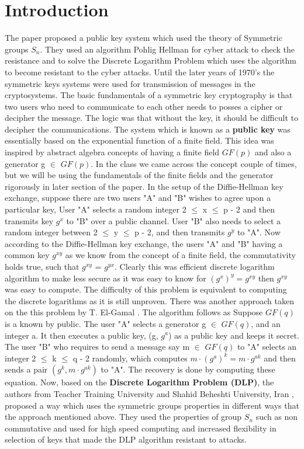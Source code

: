 \documentclass{IEEEtran}
\begin{document}
\section{Introduction}
The paper proposed a public key system which used the theory of Symmetric groups $S_n$. They used an algorithm Pohlig Hellman \cite{pohlig2022improved} for cyber attack to check the resistance and to solve the Discrete Logarithm Problem which uses the algorithm to become resistant to the cyber attacks. Until the later years of 1970's the symmetric keys systems were used for transmission of messages in the cryptosystems. The basic fundamentals of a symmetric key cryptography is that two users who need to communicate to each other needs to posses a cipher or decipher the message. The logic was that without the key, it should be difficult to decipher the communications. The system which is known as a \textbf{public key} was essentially based on the exponential function of a finite field. This idea was inspired by abstract algebra concepts of having a finite field $GF(p)$ and also a generator g \(\in\) $GF(p)$. In the class we came across the concept couple of times, but we will be using the fundamentals of the finite fields and the generator rigorously in later section of the paper.  In the setup of the Diffie-Hellman key \cite{diffie1988first} exchange, suppose there are two users "A" and "B" wishes to agree upon a particular key, User "A" selects a random integer 2 \(\leq\) x \(\leq\) p - 2 and then transmits key $g^{x}$ to "B" over a public channel. User "B" also needs to select a random integer between 2 \(\leq\) y \(\leq\) p - 2, and then transmits $g^{y}$ to "A". Now according to the Diffie-Hellman key exchange, the users "A" and "B" having a common key $g^{xy}$ as we know from the concept of a finite field, the commutativity holds true, such that $g^{xy}$ = $g^{yx}$. Clearly this was efficient discrete logarithm algorithm to make less secure as it was easy to know for $(g^x)^y = g^{xy}$ then $g^{xy}$ was easy to compute. The difficulty of this problem is equivalent to computing the discrete logarithms as it is still unproven. \newline
There was another approach taken on the this problem by T. El-Gamal \cite{elgamal1985public}. The algorithm follows as Suppose $GF(q)$ is a known by public. The user "A" selects a generator g \(\in\) $GF(q)$, and an integer a. It then executes a public key, (g, $g^{a}$) as a public key and keeps it secret. The user "B" who requires to send a message say m \(\in\) $GF(q)$ to "A" selects an integer 2 \(\leq\) k \(\leq\) q - 2 randomly, which computes $m \cdot (g^a)^k = m \cdot g^{ak}$ and then sends a pair $(g^k, m \cdot g^{ak})$ to "A". The recovery is done by computing these equation. Now, based on the \textbf{Discrete Logarithm Problem (DLP)}, the authors from Teacher Training University and Shahid Beheshti University, Iran \cite{doliskani2008cryptosystem}, proposed a way which uses the symmetric groups properties in different ways that the approach mentioned above. They used the properties of group $S_n$ such as non commutative and used for high speed computing and increased flexibility in selection of keys that made the DLP algorithm resistant to attacks. \\
\end{document}
